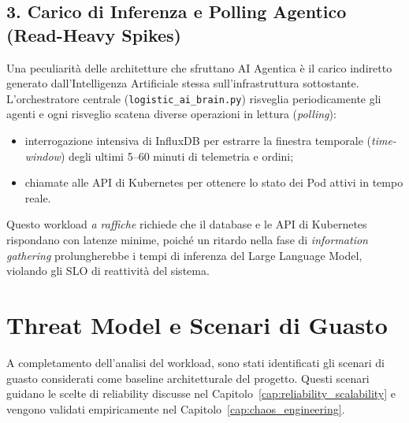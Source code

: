\subsection*{3. Carico di Inferenza e Polling Agentico (Read-Heavy Spikes)}
Una peculiarità delle architetture che sfruttano AI Agentica è il carico indiretto generato dall'Intelligenza Artificiale stessa sull'infrastruttura sottostante. L'orchestratore centrale (\texttt{logistic\_ai\_brain.py}) risveglia periodicamente gli agenti e ogni risveglio scatena diverse operazioni in lettura (\textit{polling}):
\begin{itemize}
    \item interrogazione intensiva di InfluxDB per estrarre la finestra temporale (\textit{time-window}) degli ultimi 5--60 minuti di telemetria e ordini;
    \item chiamate alle API di Kubernetes per ottenere lo stato dei Pod attivi in tempo reale.
\end{itemize}
Questo workload \emph{a raffiche} richiede che il database e le API di Kubernetes rispondano con latenze minime, poiché un ritardo nella fase di \textit{information gathering} prolungherebbe i tempi di inferenza del Large Language Model, violando gli SLO di reattività del sistema.

\section{Threat Model e Scenari di Guasto}
\label{sec:threat_model}

A completamento dell'analisi del workload, sono stati identificati gli scenari di guasto considerati come baseline architetturale del progetto. Questi scenari guidano le scelte di reliability discusse nel Capitolo~\ref{cap:reliability_scalability} e vengono validati empiricamente nel Capitolo~\ref{cap:chaos_engineering}.

